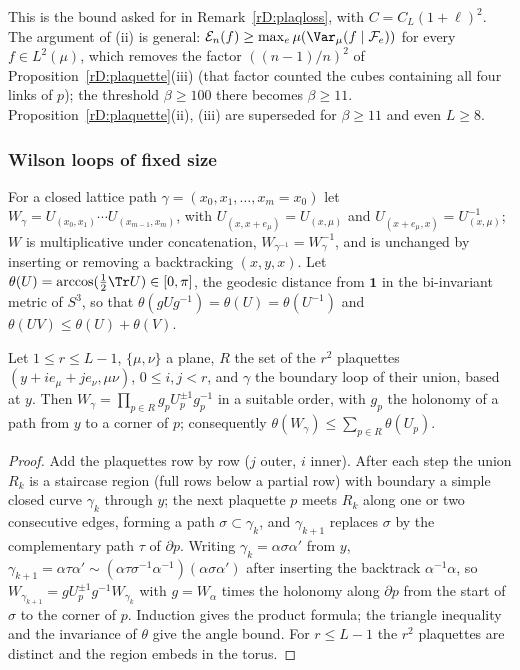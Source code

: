 This is the bound asked for in Remark~\ref{rD:plaqloss}, with $C=C_L(1+\ell
)^2$. The argument of (ii) is general: $\mathcal E_n(f)\ge\max_e\mu(\Var_\mu(f
\mid\mathcal F_e))$ for every $f\in L^2(\mu)$, which removes the factor
$((n-1)/n)^2$ of Proposition~\ref{rD:plaquette}(iii) (that factor counted the
cubes containing all four links of $p$); the threshold $\beta\ge100$ there
becomes $\beta\ge11$. Proposition~\ref{rD:plaquette}(ii), (iii) are
superseded for $\beta\ge11$ and even $L\ge8$.

\subsubsection{Wilson loops of fixed size}

For a closed lattice path $\gamma=(x_0,x_1,\dots,x_m=x_0)$ let $W_\gamma=
U_{(x_0,x_1)}\cdots U_{(x_{m-1},x_m)}$, with $U_{(x,x+e_\mu)}=U_{(x,\mu)}$
and $U_{(x+e_\mu,x)}=U_{(x,\mu)}^{-1}$; $W$ is multiplicative under
concatenation, $W_{\gamma^{-1}}=W_\gamma^{-1}$, and is unchanged by inserting
or removing a backtracking $(x,y,x)$. Let $\theta(U)=\arccos(\frac12\Tr U)
\in[0,\pi]$, the geodesic distance from $\mathbf 1$ in the bi-invariant
metric of $S^3$, so that $\theta(gUg^{-1})=\theta(U)=\theta(U^{-1})$ and
$\theta(UV)\le\theta(U)+\theta(V)$.

\begin{lemma}[lassos]\label{rDtwo:lasso}
Let $1\le r\le L-1$, $\{\mu,\nu\}$ a plane, $R$ the set of the $r^2$
plaquettes $(y+ie_\mu+je_\nu,\mu\nu)$, $0\le i,j<r$, and $\gamma$ the
boundary loop of their union, based at $y$. Then $W_\gamma=\prod_{p\in R}
g_pU_p^{\pm1}g_p^{-1}$ in a suitable order, with $g_p$ the holonomy of a
path from $y$ to a corner of $p$; consequently $\theta(W_\gamma)\le\sum_{p
\in R}\theta(U_p)$.
\end{lemma}

\begin{proof}
Add the plaquettes row by row ($j$ outer, $i$ inner). After each step the
union $R_k$ is a staircase region (full rows below a partial row) with
boundary a simple closed curve $\gamma_k$ through $y$; the next plaquette
$p$ meets $R_k$ along one or two consecutive edges, forming a path $\sigma
\subset\gamma_k$, and $\gamma_{k+1}$ replaces $\sigma$ by the complementary
path $\tau$ of $\partial p$. Writing $\gamma_k=\alpha\sigma\alpha'$ from $y$,
$\gamma_{k+1}=\alpha\tau\alpha'\sim(\alpha\tau\sigma^{-1}\alpha^{-1})(\alpha
\sigma\alpha')$ after inserting the backtrack $\alpha^{-1}\alpha$, so
$W_{\gamma_{k+1}}=gU_p^{\pm1}g^{-1}W_{\gamma_k}$ with $g=W_\alpha$ times the
holonomy along $\partial p$ from the start of $\sigma$ to the corner of $p$.
Induction gives the product formula; the triangle inequality and the
invariance of $\theta$ give the angle bound. For $r\le L-1$ the $r^2$
plaquettes are distinct and the region embeds in the torus.
\end{proof}

